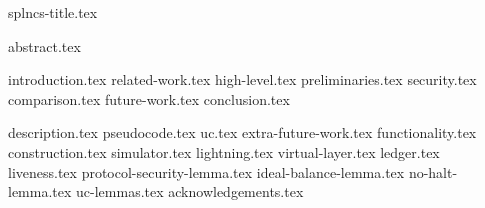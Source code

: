 \documentclass{llncs}
\begin{document}
\pagestyle{plain}
{splncs-title.tex}
\maketitle
{abstract.tex}



{introduction.tex}
{related-work.tex}
{high-level.tex}
{preliminaries.tex}
{security.tex}
{comparison.tex}
{future-work.tex}
{conclusion.tex}

\newpage
\makeatletter%
%
  {\appendices}%
  {\appendix}%
\makeatother%
{description.tex}
{pseudocode.tex}
{uc.tex}
{extra-future-work.tex}
{functionality.tex}
{construction.tex}
{simulator.tex}
{lightning.tex}
{virtual-layer.tex}
{ledger.tex}
{liveness.tex}
{protocol-security-lemma.tex}
{ideal-balance-lemma.tex}
{no-halt-lemma.tex}
{uc-lemmas.tex}
{acknowledgements.tex}
\end{document}
